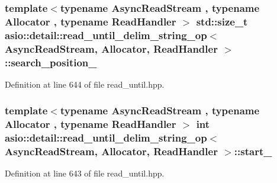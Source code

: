 \hypertarget{classasio_1_1detail_1_1read__until__delim__string__op_ae47f60cd8b8f757c747b83ac1a50a5ec}{}
\subsubsection[{search\+\_\+position\+\_\+}]{\setlength{\rightskip}{0pt plus 5cm}template$<$typename Async\+Read\+Stream , typename Allocator , typename Read\+Handler $>$ std\+::size\+\_\+t {\bf asio\+::detail\+::read\+\_\+until\+\_\+delim\+\_\+string\+\_\+op}$<$ Async\+Read\+Stream, Allocator, Read\+Handler $>$\+::search\+\_\+position\+\_\+}\label{classasio_1_1detail_1_1read__until__delim__string__op_ae47f60cd8b8f757c747b83ac1a50a5ec}


Definition at line 644 of file read\+\_\+until.\+hpp.

\hypertarget{classasio_1_1detail_1_1read__until__delim__string__op_a6a220ea1de38a1c04f0dc706b9e6f04c}{}
\subsubsection[{start\+\_\+}]{\setlength{\rightskip}{0pt plus 5cm}template$<$typename Async\+Read\+Stream , typename Allocator , typename Read\+Handler $>$ int {\bf asio\+::detail\+::read\+\_\+until\+\_\+delim\+\_\+string\+\_\+op}$<$ Async\+Read\+Stream, Allocator, Read\+Handler $>$\+::start\+\_\+}\label{classasio_1_1detail_1_1read__until__delim__string__op_a6a220ea1de38a1c04f0dc706b9e6f04c}


Definition at line 643 of file read\+\_\+until.\+hpp.

\hypertarget{classasio_1_1detail_1_1read__until__delim__string__op_afcad1583fe64f8d6eb8b5ca51b0f2510}{}
